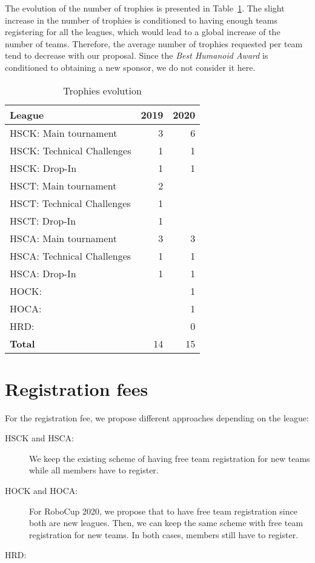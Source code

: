 \documentclass{article}
\begin{document}
The evolution of the number of trophies is presented in
Table~\ref{tab:trophies}.
The slight increase in the number of trophies is conditioned to having enough
teams registering for all the leagues, which would lead to a global increase of
the number of teams.
Therefore, the average number of trophies requested per team tend to decrease
with our proposal.
Since the \emph{Best Humanoid Award} is conditioned to obtaining a new sponsor,
we do not consider it here.
\begin{table}[h]
  \centering
  \caption{\label{tab:trophies}Trophies evolution}
  \begin{tabular}{l | r | r}
    League & 2019 & 2020\\
    \hline
    HSCK: Main tournament & 3 & 6\\ 
    HSCK: Technical Challenges & 1 & 1\\
    HSCK: Drop-In & 1 & 1\\
    HSCT: Main tournament & 2 & \\ 
    HSCT: Technical Challenges & 1 & \\
    HSCT: Drop-In & 1 & \\
    HSCA: Main tournament & 3 & 3\\ 
    HSCA: Technical Challenges & 1 & 1\\
    HSCA: Drop-In & 1 & 1\\
    HOCK: &  & 1\\
    HOCA: &  & 1\\ 
    HRD: &  & 0\\
    \hline
    \textbf{Total} & 14 & 15
  \end{tabular}
\end{table}



\section{Registration fees}

For the registration fee, we propose different approaches depending on the
league:

\begin{description}
\item[HSCK and HSCA:] We keep the existing scheme of having free team
  registration for new teams while all members have to register.
\item[HOCK and HOCA:] For RoboCup 2020, we propose that to have free team
  registration since both are new leagues.
  Then, we can keep the same scheme with free team registration for new teams.
  In both cases, members still have to register.
\item[HRD:] 
\end{description}
\end{document}
